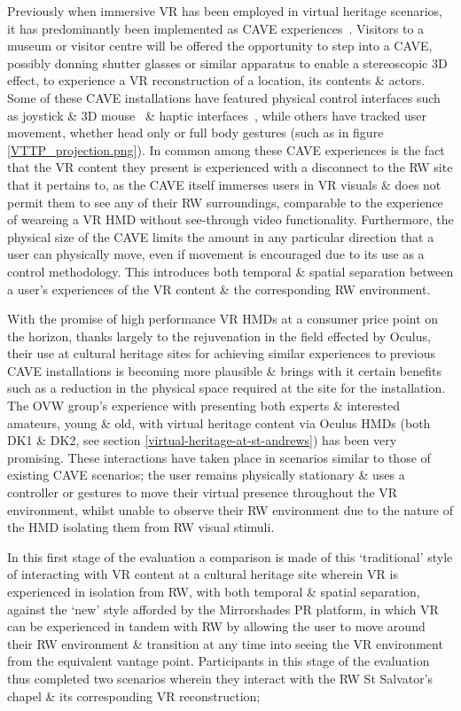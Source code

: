 Previously when immersive VR has been employed in virtual heritage scenarios, it has predominantly been implemented as CAVE experiences~\cite{Roussou2002}. Visitors to a museum or visitor centre will be offered the opportunity to step into a CAVE, possibly donning shutter glasses or similar apparatus to enable a stereoscopic 3D effect, to experience a VR reconstruction of a location, its contents \& actors. Some of these CAVE installations have featured physical control interfaces such as joystick \& 3D mouse~\cite{cabral:x3dexperience} \& haptic interfaces~\cite{Christou2006}, while others have tracked user movement, whether head only or full body  gestures (such as in figure \ref{VTTP_projection.png}). In common among these CAVE experiences is the fact that the VR content they present is experienced with a disconnect to the RW site that it pertains to, as the CAVE itself immerses users in VR visuals \& does not permit them to see any of their RW surroundings, comparable to the experience of weareing a VR HMD without see-through video functionality. Furthermore, the physical size of the CAVE limits the amount in any particular direction that a user can physically move, even if movement is encouraged due to its use as a control methodology. This introduces both temporal \& spatial separation between a user's experiences of the VR content \& the corresponding RW environment.

With the promise of high performance VR HMDs at a consumer price point on the horizon, thanks largely to the rejuvenation in the field effected by Oculus, their use at cultural heritage sites for achieving similar experiences to previous CAVE installations is becoming more plausible \& brings with it certain benefits such as a reduction in the physical space required at the site for the installation. The OVW group's experience with presenting both experts \& interested amateurs, young \& old, with virtual heritage content via Oculus HMDs (both DK1 \& DK2, see section \ref{virtual-heritage-at-st-andrews}) has been very promising. These interactions have taken place in scenarios similar to those of existing CAVE scenarios; the user remains physically stationary \& uses a controller or gestures to move their virtual presence throughout the VR environment, whilst unable to observe their RW environment due to the nature of the HMD isolating them from RW visual stimuli.

In this first stage of the evaluation a comparison is made of this `traditional' style of interacting with VR content at a cultural heritage site wherein VR is experienced in isolation from RW, with both temporal \& spatial separation, against the `new' style afforded by the Mirrorshades PR platform, in which VR can be experienced in tandem with RW by allowing the user to move around their RW environment \& transition at any time into seeing the VR environment from the equivalent vantage point. Participants in this stage of the evaluation thus completed two scenarios wherein they interact with the RW St Salvator's chapel \& its corresponding VR reconstruction;

